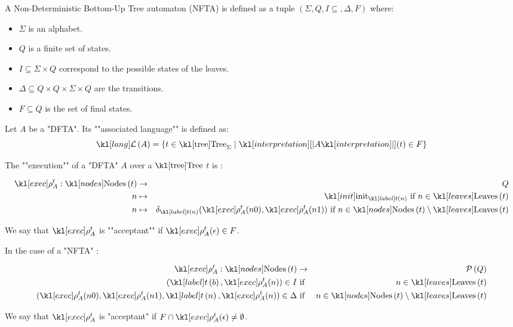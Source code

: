\documentclass{article}
\begin{document}
\begin{definition}
	A Non-Deterministic Bottom-Up Tree automaton (NFTA) is defined as a tuple
	$(\Sigma, Q, I \subseteq, \Delta , F )$ where:
	\begin{itemize}
		\item $\Sigma$ is an alphabet.
		\item $Q$ is a finite set of states.
		\item $I \subseteq \Sigma \times Q$ correspond to the possible states of the leaves.
		\item $\Delta \subseteq Q \times Q \times \Sigma \times Q$ are the transitions.
		\item $F \subseteq Q$ is the set of final states.
	\end{itemize}
\end{definition}

\begin{definition}
	Let $A$ be a "DFTA". Its ""associated language"" is defined as:
	\[\lang A = \setdef {t \in \tree_{\Sigma}} {\interpret A (t) \in F}\]
\end{definition}


\begin{definition}
	The ""execution"" of a "DFTA" $A$ over a $\tree$ $t$ is :

	\begin{eqnarray*}
		\exec A t : \nodes t &\to & Q \\
		n  &\mapsto& \init_{\tlabel t n} \text{ if } n \in \leaves t \\
		n  &\mapsto& \delta_{\tlabel t n}(\exec A t (n0), \exec A t (n1)) \text{ if } n \in \nodes t \setminus \leaves t
	\end{eqnarray*}

	We say that $\exec A t$ is ""acceptant"" if $\exec A t (\epsilon) \in F$.

	In the case of a "NFTA" :

	\begin{eqnarray*}
		\exec A t : \nodes t &\to& \parts Q \\
		(\tlabel t b,  \exec A t (n)) \in I &\text{ if }& n \in \leaves t \\
		(\exec A t (n0), \exec A t (n1), \tlabel t n, \exec A t (n)) \in \Delta &\text{ if }& n \in \nodes t \setminus \leaves t
	\end{eqnarray*}

	We say that $\exec A t$ is "acceptant" if $F \cap \exec A t (\epsilon) \neq \emptyset$.

\end{definition}
\end{document}
